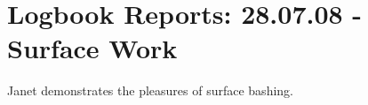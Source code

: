 \section{Logbook Reports: 28.07.08 - Surface Work}

\begin{marginfigure}
\checkoddpage \ifoddpage \forcerectofloat \else \forceversofloat \fi
\centering
 \caption{Janet demonstrates the pleasures of surface bashing. }
 \label{janet relax}
\end{marginfigure}




